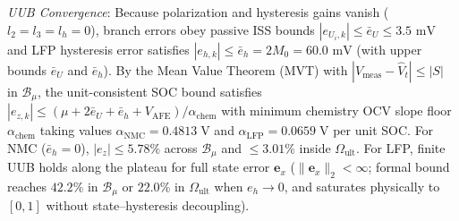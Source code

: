 \documentclass[10pt,a4paper]{article}
\begin{document}
\emph{UUB Convergence}: Because polarization and hysteresis gains vanish ($l_2 = l_3 = l_h = 0$), branch errors obey passive ISS bounds $|e_{U_i,k}| \le \bar{e}_U \le 3.5\text{ mV}$ and LFP hysteresis error satisfies $|e_{h,k}| \le \bar{e}_h = 2 M_0 = 60.0\text{ mV}$ (with upper bounds $\bar{e}_U$ and $\bar{e}_h$). By the Mean Value Theorem (MVT) with $|V_{\text{meas}} - \hat{V}_t| \le |S|$ in $\mathcal{B}_\mu$, the unit-consistent SOC bound satisfies $|e_{z,k}| \le (\mu + 2\bar{e}_U + \bar{e}_h + V_{\text{AFE}})/\alpha_{\text{chem}}$ with minimum chemistry OCV slope floor $\alpha_{\text{chem}}$ taking values $\alpha_{\text{NMC}} = 0.4813\;\mathrm{V}$ and $\alpha_{\text{LFP}} = 0.0659\;\mathrm{V}$ per unit SOC. For NMC ($\bar{e}_h = 0$), $|e_z| \le 5.78\%$ across $\mathcal{B}_\mu$ and $\le 3.01\%$ inside $\Omega_{\text{ult}}$. For LFP, finite UUB holds along the plateau for full state error $\mathbf{e}_x$ ($\|\mathbf{e}_x\|_2 < \infty$; formal bound reaches $42.2\%$ in $\mathcal{B}_\mu$ or $22.0\%$ in $\Omega_{\text{ult}}$ when $e_h \to 0$, and saturates physically to $[0, 1]$ without state--hysteresis decoupling).
\end{document}
